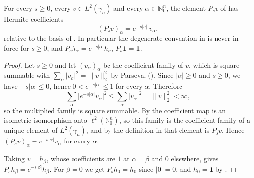 \begin{lemma}
For every $s \geq 0$, every $v \in L^2(\gamma_n)$ and every
$\alpha \in \mathbb{N}_0^n$, the element $P_s v$ of  has
Hermite coefficients
\[
  (P_s v)_\alpha = e^{-s|\alpha|}\, v_\alpha ,
\]
relative to the basis of .  In particular the degenerate
convention in  is never in force for $s \geq 0$, and
$P_s h_\alpha = e^{-s|\alpha|}h_\alpha$, $P_s\mathbf{1} = \mathbf{1}$.
\end{lemma}
\begin{proof}
Let $s \geq 0$ and let $(v_\alpha)_\alpha$ be the coefficient family of $v$,
which is square summable with $\sum_\alpha |v_\alpha|^2 = \|v\|_2^2$ by Parseval
().  Since $|\alpha| \geq 0$ and $s \geq 0$, we have
$-s|\alpha| \leq 0$, hence $0 < e^{-s|\alpha|} \leq 1$ for every $\alpha$.
Therefore
\[
  \sum_{\alpha} \bigl| e^{-s|\alpha|} v_\alpha\bigr|^2
    \leq \sum_\alpha |v_\alpha|^2 = \|v\|_2^2 < \infty ,
\]
so the multiplied family is square summable.  By  the
coefficient map is an isometric isomorphism onto $\ell^2(\mathbb{N}_0^n)$, so this
family is the coefficient family of a unique element of $L^2(\gamma_n)$, and by
the definition in  that element is $P_s v$.  Hence
$(P_s v)_\alpha = e^{-s|\alpha|}v_\alpha$ for every $\alpha$.

Taking $v = h_\beta$, whose coefficients are $1$ at $\alpha = \beta$ and $0$
elsewhere, gives $P_s h_\beta = e^{-s|\beta|}h_\beta$.  For $\beta = 0$ we get
$P_s h_0 = h_0$ since $|0| = 0$, and $h_0 = \mathbf{1}$ by
.
\end{proof}

